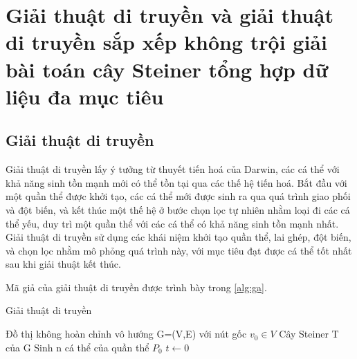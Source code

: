 \documentclass{hust}
\begin{document}
\chapter{Giải thuật di truyền và giải thuật di truyền sắp xếp không trội giải bài toán cây Steiner tổng hợp dữ liệu đa mục tiêu}

\section{Giải thuật di truyền}
Giải thuật di truyền lấy ý tưởng từ thuyết tiến hoá của Darwin, các cá thể với khả năng sinh tồn mạnh mới có thể tồn tại qua các thế hệ tiến hoá. Bắt đầu với một quần thể được khởi tạo, các cá thể mới được sinh ra qua quá trình giao phối và đột biến, và kết thúc một thế hệ ở bước chọn lọc tự nhiên nhằm loại đi các cá thể yếu, duy trì một quần thể với các cá thể có khả năng sinh tồn mạnh nhất. Giải thuật di truyền sử dụng các khái niệm khởi tạo quần thể, lai ghép, đột biến, và chọn lọc nhằm mô phỏng quá trình này, với mục tiêu đạt được cá thể tốt nhất sau khi giải thuật kết thúc.

Mã giả của giải thuật di truyền được trình bày trong \ref{alg:ga}.

\begin{algorithm}[H]
	\caption{Giải thuật di truyền}\label{alg:ga}
	\begin{algorithmic}[1]
		\Require Đồ thị không hoàn chỉnh vô hướng G=(V,E) với nút gốc $v_0 \in V$
		\Ensure Cây Steiner T của G
		\State Sinh n cá thể của quần thể $P_0$
		\EndFor
		\State $t\leftarrow 0$
		\EndWhile
	\end{algorithmic}
\end{algorithm}
\end{document}
